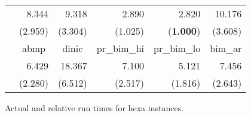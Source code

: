 \documentclass{article}
\begin{document}
\begin{figure}[ht]
\begin{center}
\begin{scriptsize}
\begin{tabular}{||c|r|r|r|r|r||}
    &   8.344   &   9.318   &   2.890   &   2.820   &   10.176  \\
    &   (2.959) &   (3.304) &   (1.025) &   ({\bf 1.000})   &   (3.608) \\  \cline{2-6}
    &   \multicolumn{1}{|c|}{{\sf abmp}}    &   \multicolumn{1}{|c|}{{\sf dinic}}   &   \multicolumn{1}{|c|}{{\sf pr\_bim\_hi}} &   \multicolumn{1}{|c|}{{\sf pr\_bim\_lo}} &   \multicolumn{1}{|c||}{{\sf bim\_ar}}    \\  \cline{2-6}
    &   6.429   &   18.367  &   7.100   &   5.121   &   7.456   \\
    &   (2.280) &   (6.512) &   (2.517) &   (1.816) &   (2.643) \\  \hline
\hline
\end{tabular}
\end{scriptsize}
\caption{\label{Figure:hexascaling} Actual and relative run times for {\sf hexa} instances.}
\end{center}
\end{figure}
\end{document}
